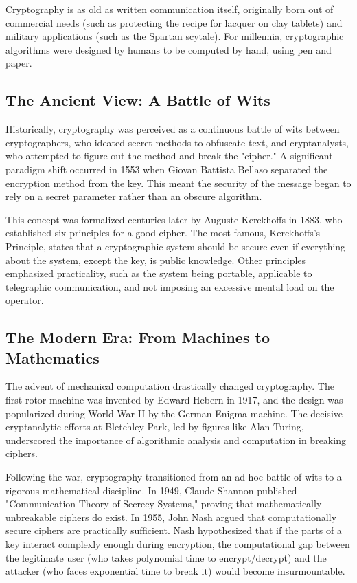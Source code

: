 Cryptography is as old as written communication itself, originally born out of commercial needs (such as protecting the recipe for lacquer on clay tablets) and military applications (such as the Spartan scytale). For millennia, cryptographic algorithms were designed by humans to be computed by hand, using pen and paper.

\subsection{The Ancient View: A Battle of Wits}
Historically, cryptography was perceived as a continuous battle of wits between cryptographers, who ideated secret methods to obfuscate text, and cryptanalysts, who attempted to figure out the method and break the "cipher." A significant paradigm shift occurred in 1553 when Giovan Battista Bellaso separated the encryption method from the key. This meant the security of the message began to rely on a secret parameter rather than an obscure algorithm.

This concept was formalized centuries later by Auguste Kerckhoffs in 1883, who established six principles for a good cipher. The most famous, Kerckhoffs's Principle, states that a cryptographic system should be secure even if everything about the system, except the key, is public knowledge. Other principles emphasized practicality, such as the system being portable, applicable to telegraphic communication, and not imposing an excessive mental load on the operator.

\subsection{The Modern Era: From Machines to Mathematics}
The advent of mechanical computation drastically changed cryptography. The first rotor machine was invented by Edward Hebern in 1917, and the design was popularized during World War II by the German Enigma machine. The decisive cryptanalytic efforts at Bletchley Park, led by figures like Alan Turing, underscored the importance of algorithmic analysis and computation in breaking ciphers.

Following the war, cryptography transitioned from an ad-hoc battle of wits to a rigorous mathematical discipline. In 1949, Claude Shannon published "Communication Theory of Secrecy Systems," proving that mathematically unbreakable ciphers do exist. In 1955, John Nash argued that computationally secure ciphers are practically sufficient. Nash hypothesized that if the parts of a key interact complexly enough during encryption, the computational gap between the legitimate user (who takes polynomial time to encrypt/decrypt) and the attacker (who faces exponential time to break it) would become insurmountable.

